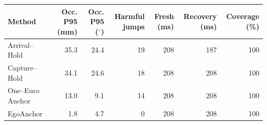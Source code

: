 \begin{tabular}{lrrrrrr}
\toprule
Method & Occ. P95 (mm) & Occ. P95 ($^\circ$) & Harmful jumps & Fresh (ms) & Recovery (ms) & Coverage (\%) \\
\midrule
Arrival--Hold & 35.3 & 24.4 & 19 & 208 & 187 & 100 \\
Capture--Hold & 34.1 & 24.6 & 18 & 208 & 208 & 100 \\
One--Euro Anchor & 13.0 & 9.1 & 14 & 208 & 208 & 100 \\
EgoAnchor & 1.8 & 4.7 & 0 & 208 & 208 & 100 \\
\bottomrule
\end{tabular}
